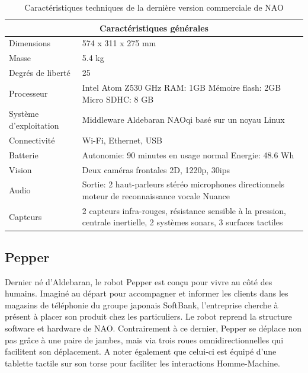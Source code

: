 \begin{table}[H]
	\begin{tabular}{ | l | p{10cm} | }
	\hline
	\multicolumn{2}{|c|}{Caractéristiques générales} \\
	\hline
	Dimensions & 574 x 311 x 275 mm \\
	\hline 
	Masse & 5.4 kg \\
	\hline 
	Degrés de liberté  & 25 \\
	\hline
	Processeur & Intel Atom Z530 \newline 1.6 GHz \newline RAM: 1GB \newline Mémoire flash: 2GB  \newline Micro SDHC: 8 GB \\
	\hline
	Système d'exploitation & Middleware Aldebaran NAOqi basé sur un noyau Linux \\
	\hline
	Connectivité & Wi-Fi, Ethernet, USB \\
	\hline
	Batterie & Autonomie: 90 minutes en usage normal \newline Energie: 48.6 Wh \\
	\hline 
	Vision & Deux caméras frontales 2D, 1220p, 30ips \\
	\hline
	Audio & Sortie: 2 haut-parleurs stéréo \newline 4 microphones directionnels \newline moteur de reconnaissance vocale Nuance  \\
	\hline
	Capteurs & 2 capteurs infra-rouges, résistance sensible à la pression, centrale inertielle, 2 systèmes sonars, 3 surfaces tactiles \\
	\hline
	\end{tabular}
\caption[Caractéristiques techniques de NAO]{Caractéristiques techniques de la dernière version commerciale de NAO}
\label {tab: Caractéristiques techniques de Nao}
\cite{NaoTech}
\end{table}

\subsection{Pepper}
\label{Entreprise: Les produits: Pepper}
Dernier né d'Aldebaran, le robot Pepper est conçu pour vivre au côté des humains. Imaginé au départ pour accompagner et informer les clients dans les magasins de téléphonie du groupe japonais SoftBank, l'entreprise cherche à présent à placer son produit chez les particuliers. Le robot reprend la structure software et hardware de NAO. Contrairement à ce dernier, Pepper se déplace non pas grâce à une paire de jambes, mais via trois roues omnidirectionnelles qui facilitent son déplacement. A noter également que celui-ci est équipé d'une tablette tactile sur son torse pour faciliter les interactions Homme-Machine.

